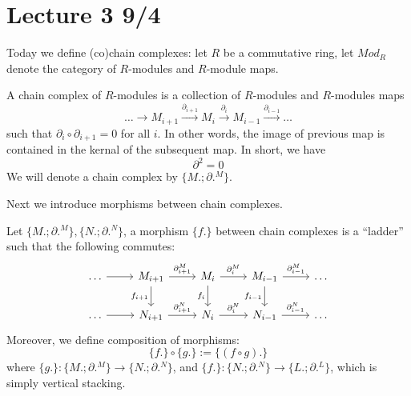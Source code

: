 \section{Lecture 3 9/4}
Today we define (co)chain complexes: let $R$ be a commutative ring, let $Mod_R$ denote the category of $R$-modules and $R$-module maps.
\begin{defn}
    A chain complex of $R$-modules is a collection of $R$-modules and $R$-modules maps 
    \begin{equation*}
        \dots\to M_{i+1}\xrightarrow{\partial_{i+1}}M_i\xrightarrow{\partial_i}M_{i-1}\xrightarrow{\partial_{i-1}}\dots
    \end{equation*}
    such that $\partial_i\circ\partial_{i+1}=0$ for all $i$. In other words, the image of previous map is contained in the kernal of the subsequent map. In short, we have 
    \begin{equation*}
        \partial^2=0
    \end{equation*}
    We will denote a chain complex by $\{M.; \partial.^M\}$.
\end{defn}
Next we introduce morphisms between chain complexes.
\begin{defn}
    Let $\{M.;\partial.^M\}, \{N.;\partial.^N\}$, a morphism $\{f.\}$ between chain complexes is a ``ladder'' such that the following commutes:
    \[\begin{tikzcd}
        \dots & {M_{i+1}} & {M_i} & {M_{i-1}} & \dots \\
        \dots & {N_{i+1}} & {N_i} & {N_{i-1}} & \dots
        \arrow[from=1-1, to=1-2]
        \arrow["{\partial_{i+1}^M}", from=1-2, to=1-3]
        \arrow["{f_{i+1}}"', from=1-2, to=2-2]
        \arrow["{\partial_i^M}", from=1-3, to=1-4]
        \arrow["{f_i}"', from=1-3, to=2-3]
        \arrow["{\partial_{i-1}^M}", from=1-4, to=1-5]
        \arrow["{f_{i-1}}"', from=1-4, to=2-4]
        \arrow[from=2-1, to=2-2]
        \arrow["{\partial_{i+1}^N}", from=2-2, to=2-3]
        \arrow["{\partial_i^N}", from=2-3, to=2-4]
        \arrow["{\partial_{i-1}^N}", from=2-4, to=2-5]
    \end{tikzcd}\]
    Moreover, we define composition of morphisms:
    \begin{equation*}
        \{f.\}\circ \{g.\}:=\{(f\circ g).\}
    \end{equation*}
    where $\{g.\}:\{M.;\partial.^M\}\to\{N.;\partial.^N\}$, and $\{f.\}:\{N.;\partial.^N\}\to \{L.;\partial.^L\}$, which is simply vertical stacking.
\end{defn}

